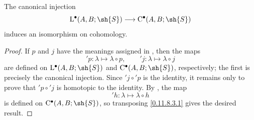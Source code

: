 \begin{proposition}[11.8.5]
\label{0.11.8.5}
The canonical injection
\[
  \mathrm{L}^\bullet(A,B;\sh{S})
  \longrightarrow
  \mathrm{C}^\bullet(A,B;\sh{S})
\]
induces an isomorphism on cohomology.
\end{proposition}

\begin{proof}
If $p$ and $j$ have the meanings assigned in , then
the maps
\[
  {}'\!p:\lambda\longmapsto\lambda\circ p,
  \qquad
  {}'\!j:\lambda\longmapsto\lambda\circ j
\]
are defined on $\mathrm{L}^\bullet(A,B;\sh{S})$ and
$\mathrm{C}^\bullet(A,B;\sh{S})$, respectively; the first is precisely
the canonical injection.
Since ${}'\!j\circ{}'\!p$ is the identity, it remains only to prove
that ${}'\!p\circ{}'\!j$ is homotopic to the identity.
By , the map
\[
  {}'\!h:\lambda\longmapsto\lambda\circ h
\]
is defined on $\mathrm{C}^\bullet(A,B;\sh{S})$, so transposing
\eqref{0.11.8.3.1} gives the desired result.
\end{proof}

